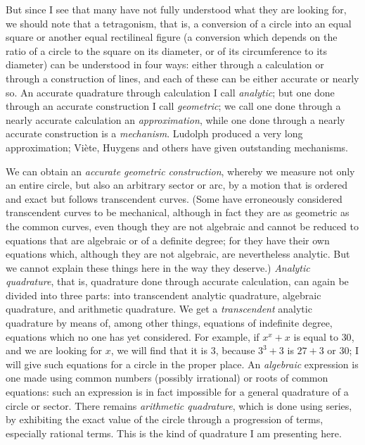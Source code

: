 \documentclass[twoside,openright]{article}
\begin{document}
But since I see that many have not fully understood what they are
looking for, we should note that a tetragonism, that is, a conversion
of a circle into an equal square or another equal rectilineal figure
(a conversion which depends on the ratio of a circle to the square on
its diameter, or of its circumference to its diameter) can be understood in four ways: either
through a calculation or through a construction of lines, and each of
these can be either accurate or nearly so.  An accurate quadrature
through calculation I call {\em analytic}; but one done through an
accurate construction I call {\em geometric}; we call one done through
a nearly accurate calculation an {\em approximation}, while one done
through a nearly accurate construction is a {\em mechanism}.  Ludolph
produced a very long approximation; Vi\`{e}te, Huygens and others have
given outstanding mechanisms.

We can obtain an {\em accurate geometric construction}, whereby we
measure not only an entire circle, but also an arbitrary sector or
arc, by a motion that is ordered and exact but follows
transcendent\label{accgeo} curves. (Some have erroneously considered transcendent
curves to be mechanical, although in fact they are as geometric as the
common curves, even though they are not algebraic and cannot be
reduced to equations that are algebraic or of a definite degree; for
they have their own equations which, although they are not algebraic,
are nevertheless analytic.  But we cannot explain these things here in
the way they deserve.)  {\em Analytic quadrature}, that is, quadrature
done through accurate calculation, can again be divided into three
parts: into transcendent analytic quadrature, algebraic quadrature,
and arithmetic quadrature.  We get a {\em transcendent} analytic
quadrature by means of, among other things, equations of indefinite
degree, equations which no one has yet considered.  For example, if
$x^x + x$ is equal to $30$, and we are looking for $x$, we will find
that it is 3, because $3^3 + 3$ is $27 + 3$ or $30$; I will give such
equations for a circle in the proper place.  An {\em algebraic}
expression is one made using common numbers (possibly irrational) or
roots of common equations: such an expression is in fact impossible
for a general quadrature of a circle or sector. There remains {\em arithmetic quadrature}, which
is done using series, by exhibiting the exact value of the circle
through a progression of terms, especially rational terms.  This is
the kind of quadrature I am presenting here.
\end{document}
